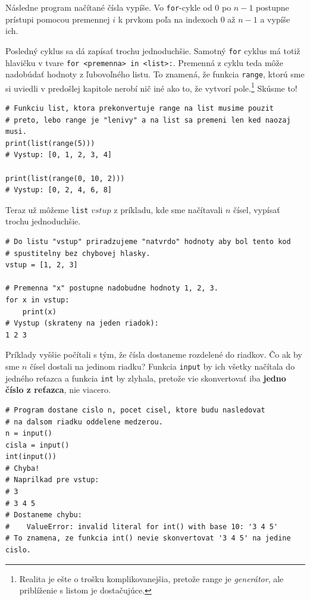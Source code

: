 \documentclass{article}
\begin{document}
Následne program načítané čísla vypíše. Vo \texttt{for}-cykle od $0$ po $n - 1$ postupne prístupi pomocou premennej $i$ k prvkom poľa na indexoch $0$ až $n - 1$ a vypíše ich.

Posledný cyklus sa dá zapísať trochu jednoduchšie. Samotný \texttt{for} cyklus má totiž hlavičku v tvare \texttt{for <premenna> in <list>:}. Premenná z cyklu teda môže nadobúdať hodnoty z ľubovoľného listu. To znamená, že funkcia \texttt{range}, ktorú sme si uviedli v predošlej kapitole nerobí nič iné ako to, že vytvorí pole.\footnote{Realita je ešte o trošku komplikovanejšia, pretože range je \textit{generátor}, ale priblíženie s listom je dostačujúce.} Skúsme to!
\begin{lstlisting}
# Funkciu list, ktora prekonvertuje range na list musime pouzit
# preto, lebo range je "lenivy" a na list sa premeni len ked naozaj musi.
print(list(range(5)))
# Vystup: [0, 1, 2, 3, 4]

print(list(range(0, 10, 2)))
# Vystup: [0, 2, 4, 6, 8]
\end{lstlisting}

Teraz už môžeme \texttt{list} $vstup$ z príkladu, kde sme načítavali $n$ čísel, vypísať trochu jednoduchšie.
\begin{lstlisting}
# Do listu "vstup" priradzujeme "natvrdo" hodnoty aby bol tento kod
# spustitelny bez chybovej hlasky.
vstup = [1, 2, 3]

# Premenna "x" postupne nadobudne hodnoty 1, 2, 3.
for x in vstup:
    print(x)
# Vystup (skrateny na jeden riadok):
1 2 3
\end{lstlisting}

Príklady vyššie počítali s tým, že čísla dostaneme rozdelené do riadkov. Čo ak by sme $n$ čísel dostali na jedinom riadku? Funkcia \texttt{input} by ich všetky načítala do jedného reťazca a funkcia \texttt{int} by zlyhala, pretože vie skonvertovať iba \textbf{jedno číslo z reťazca}, nie viacero.
\begin{lstlisting}
# Program dostane cislo n, pocet cisel, ktore budu nasledovat
# na dalsom riadku oddelene medzerou.
n = input()
cisla = input()
int(input())
# Chyba!
# Naprilkad pre vstup:
# 3
# 3 4 5
# Dostaneme chybu:
#    ValueError: invalid literal for int() with base 10: '3 4 5'
# To znamena, ze funkcia int() nevie skonvertovat '3 4 5' na jedine cislo.
\end{lstlisting}
\end{document}
